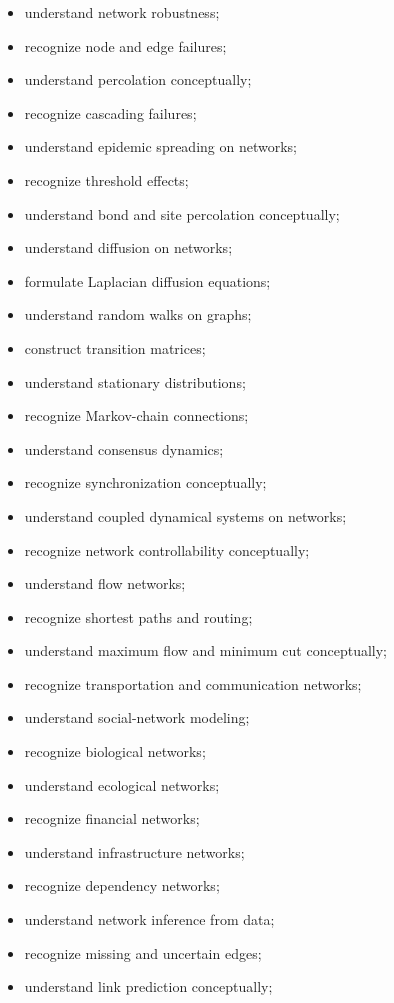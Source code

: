 {\begin{itemize}
    \item understand network robustness;
    \item recognize node and edge failures;
    \item understand percolation conceptually;
    \item recognize cascading failures;
    \item understand epidemic spreading on networks;
    \item recognize threshold effects;
    \item understand bond and site percolation conceptually;
    \item understand diffusion on networks;
    \item formulate Laplacian diffusion equations;
    \item understand random walks on graphs;
    \item construct transition matrices;
    \item understand stationary distributions;
    \item recognize Markov-chain connections;
    \item understand consensus dynamics;
    \item recognize synchronization conceptually;
    \item understand coupled dynamical systems on networks;
    \item recognize network controllability conceptually;
    \item understand flow networks;
    \item recognize shortest paths and routing;
    \item understand maximum flow and minimum cut conceptually;
    \item recognize transportation and communication networks;
    \item understand social-network modeling;
    \item recognize biological networks;
    \item understand ecological networks;
    \item recognize financial networks;
    \item understand infrastructure networks;
    \item recognize dependency networks;
    \item understand network inference from data;
    \item recognize missing and uncertain edges;
    \item understand link prediction conceptually;

\end{itemize}}
